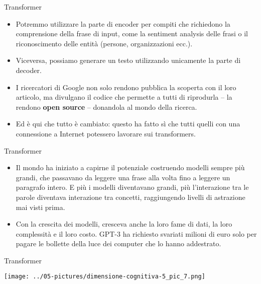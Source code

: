 \documentclass[aspectratio=169]{beamer}
\begin{document}
%
%
\begin{frame}{Transformer}
\begin{itemize}
\item Potremmo utilizzare la parte di encoder per compiti che richiedono la comprensione della frase di input, come la sentiment analysis delle frasi o il riconoscimento delle entità (persone, organizzazioni ecc.). 
\item Viceversa, possiamo generare un testo utilizzando unicamente la parte di decoder.
\item I ricercatori di Google non solo rendono pubblica la scoperta con il loro articolo, ma divulgano il codice che permette a tutti di riprodurla – la rendono \textbf{open source} – donandola al mondo della ricerca. 
\item Ed è qui che tutto è cambiato: questo ha fatto sì che tutti quelli con una connessione a Internet potessero lavorare sui transformers.
\end{itemize}
\end{frame}
%
%
\begin{frame}{Transformer}
\begin{itemize}
\item Il mondo ha iniziato a capirne il potenziale costruendo modelli sempre più grandi, che passavano da leggere una frase alla volta fino a leggere un paragrafo intero. E più i modelli diventavano grandi, più l’interazione tra le parole diventava interazione tra concetti, raggiungendo livelli di astrazione mai visti prima.

\item Con la crescita dei modelli, cresceva anche la loro fame di dati, la loro complessità e il loro costo. GPT-3 ha richiesto svariati milioni di euro solo per pagare le bollette della luce dei computer che lo hanno addestrato.
\end{itemize}
\end{frame}
%
%
\begin{frame}{Transformer}
\begin{center}
\texttt{[image: ../05-pictures/dimensione-cognitiva-5\_pic\_7.png]} 
\end{center}
\end{frame}
%
\end{document}
